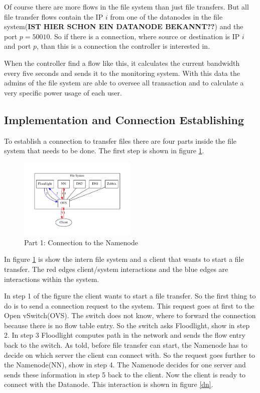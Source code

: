  Of course there are more flows in the file system than just file transfers. But all file transfer flows contain the IP $i$ from one of the datanodes in the file system(\textbf{IST HIER SCHON EIN DATANODE BEKANNT??}) and the port $p=50010$. So if there is a connection, where source or destination is IP $i$ and port $p$, than this is a connection the controller is interested in.
 
 When the controller find a flow like this, it calculates the current bandwidth every five seconds and sends it to the monitoring system. With this data the admins of the file system are able to oversee all transaction and to calculate a very specific power usage of each user. 
 
 \subsection{Implementation and Connection Establishing}               

To establish a connection to transfer files there are four parts inside the file system that needs to be done. The first step is shown in figure \ref{nn}.
 
\begin{figure}[ht]
\centering
\includegraphics[width=0.5\textwidth]{img/connectionToNamenode} 
\caption{Part 1: Connection to the Namenode}
\label{nn}
\end{figure}

In figure \ref{nn} is show the intern file system and a client that wants to start a file transfer. The red edges client/system interactions and the blue edges are interactions within the system.

In step 1 of the figure the client wants to start a file transfer. So the first thing to do is to send a connection request to the system. This request goes at first to the Open vSwitch(OVS). The switch does not know, where to forward the connection because there is no flow table entry. So the switch asks Floodlight, show in step 2. In step 3 Floodlight computes path in the network and sends the flow entry back to the switch. As told, before file transfer can start, the Namenode has to decide on which server the client can connect with. So the request goes further to the Namenode(NN), show in step 4. The Namenode decides for one server and sends these information in step 5 back to the client. Now the client is ready to connect with the Datanode. This interaction is shown in figure \ref{dn}.

